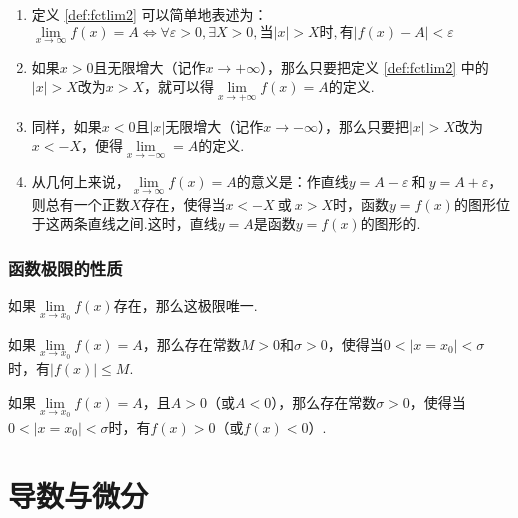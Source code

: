 \documentclass[lang=cn,10pt]{elegantbook}
\begin{document}
\begin{note}
	\begin{enumerate}
		\item 定义 \ref{def:fctlim2} 可以简单地表述为：\( \lim\limits_{x \to \infty}f(x) = A \Leftrightarrow \forall \varepsilon > 0, \exists X > 0,\text{当}|x|>X\text{时},\text{有}|f(x) - A| < \varepsilon \)
		\item 如果\( x > 0 \)且无限增大（记作\( x \to +\infty \)），那么只要把定义 \ref{def:fctlim2} 中的\( |x| > X \)改为\( x > X \)，就可以得\( \lim\limits_{x \to +\infty}f(x) = A \)的定义.
		\item 同样，如果\( x < 0 \)且\( |x| \)无限增大（记作\( x \to -\infty \)），那么只要把\( |x| > X \)改为\( x < -X \)，便得\( \lim\limits_{x \to -\infty} = A \)的定义.
		\item 从几何上来说，\( \lim\limits_{x \to \infty}f(x) = A \)的意义是：作直线\( y = A - \varepsilon\ \text{和}\ y = A + \varepsilon \)，则总有一个正数\( X \)存在，使得当\( x < -X\ \text{或}\ x > X \)时，函数\( y = f(x) \)的图形位于这两条直线之间.这时，直线\( y = A \)是函数\( y = f(x) \)的图形的.
	\end{enumerate}
\end{note}

\subsection{函数极限的性质}

\begin{theorem}[唯一性]
	如果\( \lim\limits_{x \to x_{0}}f(x) \)存在，那么这极限唯一.
\end{theorem}
\begin{theorem}[局部有界性]
	如果\( \lim\limits_{x \to x_{0}}f(x) = A \)，那么存在常数\( M > 0 \)和\( \sigma > 0 \)，使得当\( 0 < |x = x_{0}| < \sigma \)时，有\( |f(x)| \leqslant M \).
\end{theorem}
\begin{theorem}[局部保号性]
	如果\( \lim\limits_{x \to x_{0}}f(x) = A \)，且\( A > 0 \)（或\( A < 0 \)），那么存在常数\( \sigma > 0 \)，使得当\( 0 < |x = x_{0}| < \sigma \)时，有\( f(x) > 0 \)（或\( f(x) < 0 \)）.
\end{theorem}









\chapter{导数与微分}
\end{document}
